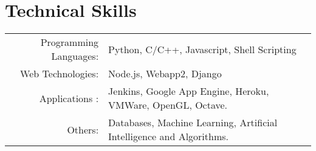 \section{Technical Skills}
\renewcommand{\arraystretch}{1}%
\begin{tabular}{rl}

Programming Languages: &  Python, C/C++, Javascript, Shell Scripting\\
Web Technologies: & Node.js, Webapp2,  Django\\
Applications : & Jenkins, Google App Engine, Heroku, VMWare, OpenGL, Octave.\\
Others: & Databases, Machine Learning, Artificial Intelligence and Algorithms. \\
\end{tabular}
\vspace{5pt}
